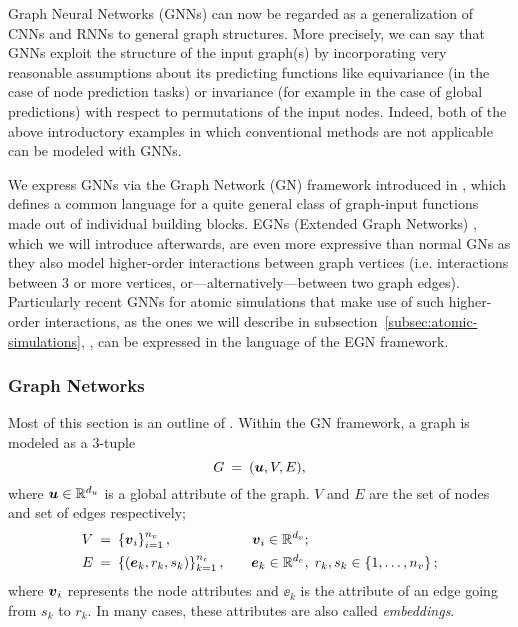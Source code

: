

Graph Neural 
Networks (GNNs) can now be regarded as a generalization of CNNs and RNNs to general graph structures.
More precisely, we can say that GNNs exploit the structure of the input graph(s) by incorporating very
reasonable assumptions about its predicting functions like equivariance (in the case of node prediction 
tasks) or invariance (for example in the case of global predictions) with respect to permutations of the 
input nodes. Indeed, both of the above introductory examples in which conventional methods are not applicable
can be modeled with GNNs.

We express GNNs via the Graph Network (GN) framework introduced in 
\cite{https://doi.org/10.48550/arxiv.1806.01261}, which defines
a common language for a quite general class of graph-input functions made out of 
individual building blocks. EGNs (Extended Graph Networks) \cite{https://doi.org/10.48550/arxiv.2203.09697}, which we will 
introduce afterwards, are even more expressive than normal 
GNs as they also model higher-order interactions between graph vertices (i.e. interactions 
between 3 or more vertices, or---alternatively---between two graph edges). Particularly recent 
GNNs for atomic simulations that make use of such higher-order interactions, as the ones we will describe 
in subsection~\ref{subsec:atomic-simulations}, \cite*{DBLP:journals/corr/abs-2003-03123,https://doi.org/10.48550/arxiv.2106.08903}, 
can be expressed in the language of the EGN framework.

\subsubsection{Graph Networks}
\label{subsubsec:gns}

Most of this section is an outline of \cite[Section 3.2]{https://doi.org/10.48550/arxiv.1806.01261}. 
Within the GN framework, a graph is modeled as a 3-tuple
\[ G \: = \: (\boldsymbol{u}, V, E) \text{,} \]
where $\boldsymbol{u} \in \mathbb{R}^{d_u}$ is a global attribute of the graph. $V$ and $E$ are the set of nodes and
set of edges respectively;
\begin{align*}
    V \: &= \: \left\{\boldsymbol{v}_i\right\}_{i=1}^{n_v},             &\quad \boldsymbol{v}_i \in \mathbb{R}^{d_v}&; \\
    E \: &= \: \left\{(\boldsymbol{e}_k, r_k, s_k)\right\}_{k=1}^{n_e}, &\quad \boldsymbol{e}_k \in \mathbb{R}^{d_e}&, \; r_k, s_k \in \left\{1, \dots, n_v\right\};
\end{align*}
where $\boldsymbol{v}_i$ represents the node attributes and $\ee_k$ is the attribute of an edge
going from $s_k$ to $r_k$. In many cases, these attributes are also called \textit{embeddings}.

